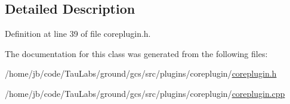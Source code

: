\subsection{\-Detailed \-Description}


\-Definition at line 39 of file coreplugin.\-h.



\-The documentation for this class was generated from the following files\-:\begin{DoxyCompactItemize}
\item 
/home/jb/code/\-Tau\-Labs/ground/gcs/src/plugins/coreplugin/\hyperlink{coreplugin_8h}{coreplugin.\-h}\item 
/home/jb/code/\-Tau\-Labs/ground/gcs/src/plugins/coreplugin/\hyperlink{coreplugin_8cpp}{coreplugin.\-cpp}\end{DoxyCompactItemize}
